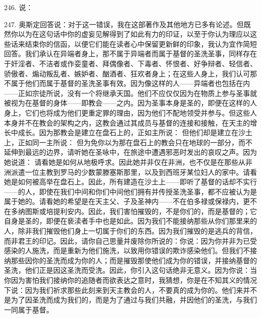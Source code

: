 246. 说：\par

247. 奥斯定回答说：对于这一错误，我在这部著作及其他地方已多有论述。但既然你以为在这句话中你的虚妄见解得到了如此有力的印证，以至于你认为理应以这些话来结束你的信函，以便它们能在读者心中保留更新鲜的印象，我认为宜作简短回答。我们承认在异端者身上，那不属于异端者而属于基督的圣洗圣事，同样存在于奸淫者、不洁者或作娈童者、拜偶像者、下毒者、怀恨者、好争辩者、轻信者、骄傲者、煽动叛乱者、嫉妒者、酗酒者、狂欢者身上；在这些人身上，我们认可那不属于他们而属于基督的圣洗圣事有效。因为像这样的人——异端者也包括在内——正如宗徒所说，没有一个将继承天国。他们不应仅仅因为在物质上参与圣事就被视为在基督的身体——即教会——之内。因为圣事本身是圣的，即便在这样的人身上，它们也将成为他们更重定罪的理由，因为他们不配地领受并参与。但这些人本身并不在教会的架构之内，这教会通过其成员与基督的连接和接触，在天主的增长中成长。因为那教会是建立在盘石上的，正如主所说： 但他们却是建立在沙土上，正如同一主所说： 但为免你以为那在盘石上的教会只在地球的一部分，而不延伸到最远的边界，请听她在圣咏中，在旅途中遭遇邪恶时发出的哀叹之声。因为她说道： 请看她是如何从地极呼求。因此她并非仅在非洲，也不仅是在那些从非洲派遣一位主教到罗马的少数蒙滕塞斯那里，以及到西班牙某位妇人的家中。请看她是如何被高举在盘石上。因此，所有建造在沙土上——即听了基督的话却不实行——的人，即使在我们中间和你们中间他们拥有并传授圣洗圣事，都不应被认为是属于她的。请看她的希望是在天主父、子及圣神内——不在伯多禄或保禄内，更不在多纳图斯或培提利安内。因此，我们害怕摧毁的，不是你们的，而是基督的；它自身是圣的，即便在亵渎者手中也是如此。因为我们不能接纳那些从你们那里来的人，除非我们摧毁他们身上一切属于你们的东西。因为我们摧毁的是逃兵的背信，而非君王的印记。因此，请你自己思量并废除你所说的：你说：因为你并非为已受感染的人施洗，而是重新为他们施洗，以致用你错误的欺诈感染他们。但我们不接纳那些因你的圣洗而成为你的人；而是摧毁那使他们成为你的错误，并接纳基督的圣洗，他们正是因这圣洗而受洗。因此，你引入这句话绝非无意义。因为你说：当你因为害怕我们接纳你的追随者而欲表达之意时，我猜想，你是在不知其义的情况下说：因为我们祈求那些此刻来到天主教会的人，不要真的成为你的。他们来并不是为了因圣洗而成为我们的，而是为了通过与我们共融，并因他们的圣洗，与我们一同属于基督。\par

